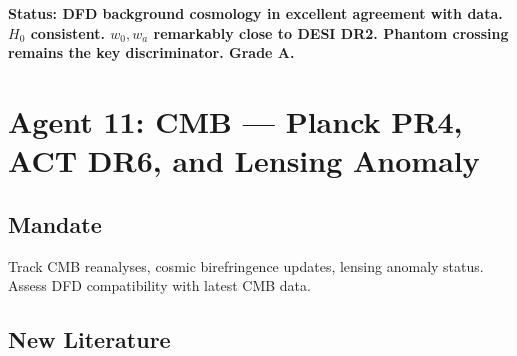 \documentclass[11pt,a4paper]{article}
\begin{document}
\textbf{Status: DFD background cosmology in excellent agreement with data. $H_0$ consistent. $w_0, w_a$ remarkably close to DESI DR2. Phantom crossing remains the key discriminator. Grade A.}

\section{Agent 11: CMB --- Planck PR4, ACT DR6, and Lensing Anomaly}

\subsection{Mandate}
Track CMB reanalyses, cosmic birefringence updates, lensing anomaly status. Assess DFD compatibility with latest CMB data.

\subsection{New Literature}
\end{document}

